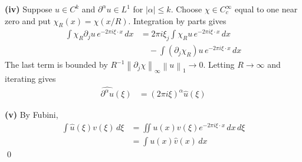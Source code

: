 \documentclass[12pt,letterpaper]{article}
\newcommand{\dx}{\,dx}
\newcommand{\norm}[1]{\left\lVert #1\right\rVert}
\newcommand{\partlabel}[1]{\par\medskip\noindent\textbf{(#1)}\enspace}
\newcommand{\finish}{\qed\par}
\begin{document}
\partlabel{iv} Suppose $u\in C^k$ and $\partial^\alpha u\in L^1$ for
$|\alpha|\leq k$. Choose $\chi\in C_c^\infty$ equal to one near zero
and put $\chi_R(x)=\chi(x/R)$. Integration by parts gives
\begin{align*}
 \int\chi_R\partial_j u\,e^{-2\pi i\xi\cdot x}\dx
 &=2\pi i\xi_j\int\chi_Ru\,e^{-2\pi i\xi\cdot x}\dx\\
 &\quad-\int(\partial_j\chi_R)u\,e^{-2\pi i\xi\cdot x}\dx
\end{align*}
The last term is bounded by
$R^{-1}\norm{\partial_j\chi}_\infty\norm{u}_1\to0$.
Letting $R\to\infty$ and iterating gives
\begin{align*}
 \widehat{\partial^\alpha u}(\xi)&=(2\pi i\xi)^\alpha\widehat u(\xi)
\end{align*}

\partlabel{v} By Fubini,
\begin{align*}
 \int\widehat u(\xi)v(\xi)\,d\xi
 &=\iint u(x)v(\xi)e^{-2\pi i\xi\cdot x}\dx\,d\xi\\
 &=\int u(x)\widehat v(x)\dx
\end{align*}
\finish
\end{document}

